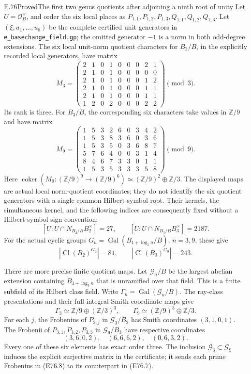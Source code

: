 \begin{statement}{E.76}{Proved}{The first two genus quotients after adjoining a ninth root of unity}
Let $U=\mathcal O_B^\times$, and order the six local places as
$P_{1,1},P_{1,2},P_{1,3},Q_{1,1},Q_{1,2},Q_{1,3}$.
Let $(\xi,u_1,\ldots,u_8)$ be the complete certified unit
generators in \texttt{e\_basechange\_field.gp}; the omitted
generator $-1$ is a norm in both odd-degree extensions.
The six local unit-norm quotient characters for $B_2/B$,
in the explicitly recorded local generators, have matrix
\[
 M_3=\begin{pmatrix}
 2&1&0&1&0&0&0&2&1\\
 2&1&0&1&0&0&0&0&0\\
 2&1&0&1&0&0&0&1&2\\
 2&1&0&1&0&0&0&1&1\\
 2&1&0&1&0&0&0&1&1\\
 1&2&0&2&0&0&0&2&2
 \end{pmatrix}\pmod3.
 \tag{E76.3}
\]
Its rank is three. For $B_3/B$, the corresponding six
characters take values in $\mathbb Z/9$ and have matrix
\[
 M_9=\begin{pmatrix}
 1&5&3&2&6&0&3&4&2\\
 1&5&3&8&3&6&0&3&6\\
 1&5&3&5&0&3&6&8&7\\
 5&7&6&4&0&0&3&1&4\\
 8&4&6&7&3&3&0&1&1\\
 1&5&3&5&3&3&3&5&8
 \end{pmatrix}\pmod9.
 \tag{E76.4}
\]
Here
$\operatorname{coker}(M_9:(\mathbb Z/9)^9\to(\mathbb Z/9)^6)
 \simeq(\mathbb Z/9)^2\oplus\mathbb Z/3$.
The displayed maps are actual local norm-quotient coordinates;
they do not identify the six quotient generators with a single
common Hilbert-symbol root. Their kernels, the simultaneous
kernel, and the following indices are consequently fixed
without a Hilbert-symbol sign convention:
\[
 [U:U\cap N_{B_2/B}B_2^\times]=27,\qquad
 [U:U\cap N_{B_3/B}B_3^\times]=2187.
 \tag{E76.5}
\]
For the actual cyclic groups $G_n=\operatorname{Gal}(B_{1+\log_3n}/B)$,
$n=3,9$, these give
\[
 |\operatorname{Cl}(B_2)^{G_3}|=81,\qquad
 |\operatorname{Cl}(B_3)^{G_9}|=243.
 \tag{E76.6}
\]

There are more precise finite quotient maps. Let $\mathcal G_n/B$
be the largest abelian extension containing $B_{1+\log_3n}$
that is unramified over that field. This is a finite subfield of
its Hilbert class field. Write $\Gamma_n=\operatorname{Gal}(\mathcal G_n/B)$.
The ray-class presentations and their full integral Smith
coordinate maps give
\[
 \Gamma_3\simeq\mathbb Z/9\oplus(\mathbb Z/3)^3,
 \qquad
 \Gamma_9\simeq(\mathbb Z/9)^3\oplus\mathbb Z/3.
 \tag{E76.7}
\]
For each $j$, the Frobenius of $P_{2,j}$ in
$\mathcal G_3/B_2$ has Smith coordinates $(3,1,0,1)$.
The Frobenii of $P_{3,1},P_{3,2},P_{3,3}$ in
$\mathcal G_9/B_3$ have respective coordinates
\[
                  (3,6,0,2),\quad(6,6,6,2),\quad(0,6,3,2).
 \tag{E76.8}
\]
Every one of these six elements has exact order three.
The inclusion $\mathcal G_3\subset\mathcal G_9$ induces
the explicit surjective matrix in the certificate; it sends
each prime Frobenius in (E76.8) to its counterpart in
(E76.7).


\end{statement}
